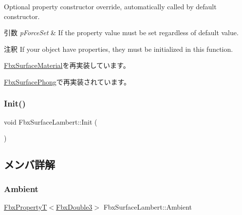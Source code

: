 Optional property constructor override, automatically called by default constructor. 
\begin{DoxyParams}{引数}
{\em p\+Force\+Set} & If the property value must be set regardless of default value. \\
\hline
\end{DoxyParams}
\begin{DoxyRemark}{注釈}
If your object have properties, they must be initialized in this function. 
\end{DoxyRemark}


\hyperlink{class_fbx_surface_material_aafc5d21293bea6b63a6ea96fa9fe0bb2}{Fbx\+Surface\+Material}を再実装しています。



\hyperlink{class_fbx_surface_phong_aa4262a042d35769e8ff745d408315bf9}{Fbx\+Surface\+Phong}で再実装されています。

\mbox{\label{class_fbx_surface_lambert_adacdc8eb6bcebc3cdd8e134d5a01f1b1}} 
\subsubsection{\texorpdfstring{Init()}{Init()}}
{\footnotesize\ttfamily void Fbx\+Surface\+Lambert\+::\+Init (\begin{DoxyParamCaption}{ }\end{DoxyParamCaption})\hspace{0.3cm}{\ttfamily [protected]}}



\subsection{メンバ詳解}
\mbox{\label{class_fbx_surface_lambert_af2b1a81d77c6cf53566cfae7f9873fd1}} 
\subsubsection{\texorpdfstring{Ambient}{Ambient}}
{\footnotesize\ttfamily \hyperlink{class_fbx_property_t}{Fbx\+PropertyT}$<$\hyperlink{fbxtypes_8h_ae0a96f14cde566774c7553aa7523b7a7}{Fbx\+Double3}$>$ Fbx\+Surface\+Lambert\+::\+Ambient}



